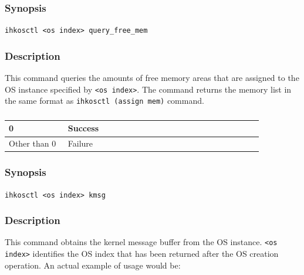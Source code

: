 \documentclass[twoside,11pt,fleqn]{book}
\begin{document}
\subsubsection{}
\subsubsection*{Synopsis}{\quad} \texttt{ihkosctl <os index> query\_free\_mem}
\subsubsection*{Description}{\quad}
This command queries the amounts of free memory areas that are assigned to the OS instance specified by \texttt{<os index>}.
The command returns the memory list in the same format as \texttt{ihkosctl (assign mem)} command.

\subsubsection*{}
\begin{table}[!h]
\footnotesize
\begin{tabular}{|p{0.20\linewidth}|p{0.66\linewidth}|} \hline
0&Success\\ \hline
Other than 0&Failure\\ \hline
\end{tabular}
\vspace{-0em}
\end{table}
\FloatBarrier

\subsubsection{}
\subsubsection*{Synopsis}{\quad} \texttt{ihkosctl <os index> kmsg}
\subsubsection*{Description}{\quad}
This command obtains the kernel message buffer from the OS instance.
\texttt{<os index>} identifies the OS index
that has been returned after the OS creation operation.
An actual example of usage would be:
\end{document}
